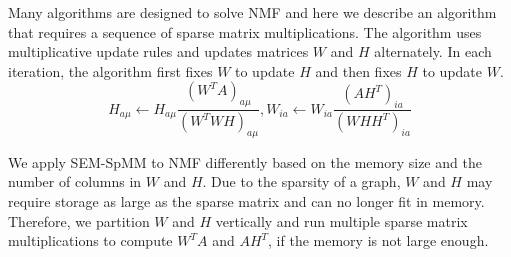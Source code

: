 Many algorithms are designed to solve NMF and here we describe an algorithm
\cite{nmf} that requires a sequence of sparse matrix multiplications.
The algorithm uses multiplicative update rules and updates matrices $W$ and $H$
alternately. In each iteration, the algorithm first fixes $W$ to update $H$
and then fixes $H$ to update $W$.
\begin{equation*}
H_{a\mu} \leftarrow H_{a\mu} \frac{{(W^TA)}_{a\mu}}{{(W^TWH)}_{a\mu}},
W_{ia} \leftarrow W_{ia} \frac{{(AH^T)}_{ia}}{{(WHH^T)}_{ia}}
\end{equation*}

We apply SEM-SpMM to NMF differently
based on the memory size and the number of columns in $W$ and $H$. Due to
the sparsity of a graph, $W$ and $H$ may require storage as large as
the sparse matrix and can no longer fit in
memory. Therefore, we partition $W$ and $H$ vertically and run multiple
sparse matrix multiplications to compute $W^TA$ and $AH^T$, if the memory is not
large enough.


